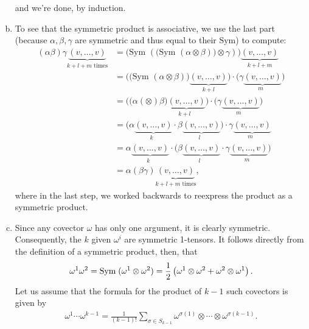 \documentclass{../../mathnotes}
\begin{document}
\begin{enumerate}[(a)]
        and we're done, by induction.
    \item To see that the symmetric product is associative, we use the last part (because $\alpha,\beta,\gamma$ are symmetric and thus equal to their $\text{Sym}$) to compute:
        \begin{align*}
            (\alpha\beta)\gamma\underbrace{(v, \dots, v)}_{\text{$k + l + m$ times}}& = \bigg( \text{Sym }\left( \big(\text{Sym }\left( \alpha \otimes \beta \right)\big) \otimes \gamma \right) \bigg) \underbrace{(v, \dots, v)}_{\text{$k + l + m$}} \\
            & = \big( \big( \text{Sym }(\alpha \otimes \beta) \big)\underbrace{(v, \dots, v)}_{\text{$k + l$}} \big)  \cdot \big( \gamma \underbrace{(v, \dots, v)}_{\text{$m$ }} \big) \\
            & = \big( \big(\alpha(\otimes)\beta\big)\underbrace{(v, \dots, v)}_{\text{$k + l$ }} \big) \cdot \big( \gamma\underbrace{(v, \dots, v)}_{\text{$m$ }} \big) \\
            & = \big( \alpha\underbrace{(v, \dots, v)}_{\text{$k$ }} \cdot \beta \underbrace{(v, \dots, v)}_{\text{$l$ }} \big)  \cdot \gamma \underbrace{(v, \dots, v)}_{\text{$m$ }} \\
            & =  \alpha\underbrace{(v, \dots, v)}_{\text{$k$ }} \cdot \big( \beta \underbrace{(v, \dots, v)}_{\text{$l$ }}   \cdot \gamma \underbrace{(v, \dots, v)}_{\text{$m$ }} \big)\\
            & = \alpha(\beta\gamma)\underbrace{(v, \dots, v)}_{\text{$k + l + m$ times}},
        \end{align*}
        where in the last step, we worked backwards to reexpress the product as a symmetric product.
    \item Since any covector $\omega$ has only one argument, it is clearly symmetric. Consequently, the $k$ given $\omega^i$ are
        symmetric 1-tensors. It follows directly from the definition of a symmetric product, then, that
        \begin{align*}
            \omega^1\omega^2=\text{Sym\;}(\omega^1\otimes\omega^2)=\frac{1}{2}\left( \omega^1\otimes\omega^2+\omega^2\otimes\omega^1 \right).
        \end{align*}
        Let us assume that the formula for the product of $k-1$ such covectors is given by
        \begin{align*}
            \omega^1\cdots\omega^{k-1}=\frac{1}{(k-1)!}\sum_{\sigma\in S_{k-1}}\omega^{\sigma(1)}\otimes \cdots\otimes\omega^{\sigma(k-1)}.
        \end{align*}

\end{enumerate}
\end{document}
